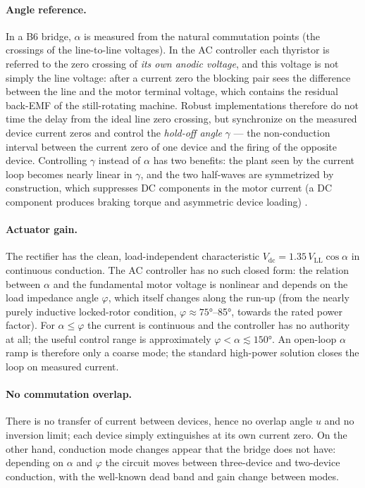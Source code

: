 \paragraph{Angle reference.} In a B6 bridge, $\alpha$ is measured from the
natural commutation points (the crossings of the line-to-line voltages). In
the AC controller each thyristor is referred to the zero crossing of
\emph{its own anodic voltage}, and this voltage is not simply the line
voltage: after a current zero the blocking pair sees the difference between
the line and the motor terminal voltage, which contains the residual
back-EMF of the still-rotating machine. Robust implementations therefore do
not time the delay from the ideal line zero crossing, but synchronize on the
measured device current zeros and control the \emph{hold-off angle}
$\gamma$ --- the non-conduction interval between the current zero of one
device and the firing of the opposite device. Controlling $\gamma$ instead
of $\alpha$ has two benefits: the plant seen by the current loop becomes
nearly linear in $\gamma$, and the two half-waves are symmetrized by
construction, which suppresses DC components in the motor current
(a DC component produces braking torque and asymmetric device loading)
\cite{zenginobuz}.

\paragraph{Actuator gain.} The rectifier has the clean, load-independent
characteristic $V_\mathrm{dc} = 1.35\,V_\mathrm{LL}\cos\alpha$ in continuous
conduction. The AC controller has no such closed form: the relation between
$\alpha$ and the fundamental motor voltage is nonlinear and depends on the
load impedance angle $\varphi$, which itself changes along the run-up (from
the nearly purely inductive locked-rotor condition, $\varphi \approx
\ang{75}$--\ang{85}, towards the rated power factor). For
$\alpha \le \varphi$ the current is continuous and the controller has no
authority at all; the useful control range is approximately
$\varphi < \alpha \lesssim \ang{150}$. An open-loop $\alpha$ ramp is
therefore only a coarse mode; the standard high-power solution closes the
loop on measured current.

\paragraph{No commutation overlap.} There is no transfer of current between
devices, hence no overlap angle $u$ and no inversion limit; each device
simply extinguishes at its own current zero. On the other hand, conduction
mode changes appear that the bridge does not have: depending on $\alpha$ and
$\varphi$ the circuit moves between three-device and two-device conduction,
with the well-known dead band and gain change between modes.

